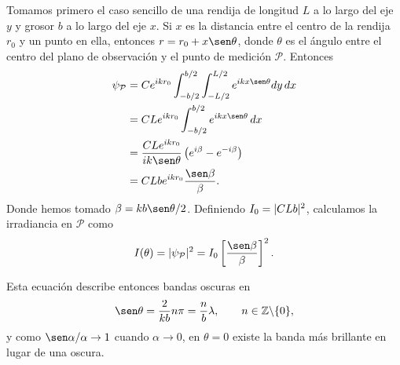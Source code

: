 \begin{multicols}{2}
Tomamos primero el caso sencillo de una rendija de longitud $L$ a lo largo del eje $y$ y grosor $b$ a lo largo del eje $x$. Si $x$ es la distancia entre el centro de la rendija $r_0$ y un punto en ella, entonces $r = r_0 + x \sen \theta$, donde $\theta$ es el ángulo entre el centro del plano de observación y el punto de medición $\mathcal P$. Entonces
\begin{equation}\label{eq: one}
	\begin{split}
		\psi_{\mathcal P} &= C\eto{ikr_0} \int_{-b/2}^{b/2} \int_{-L/2}^{L/2} \eto{ik x \sen \theta} dy \, dx\\
		&= C L\eto{ikr_0}  \int_{-b/2}^{b/2}  \eto{ik x \sen \theta}  \, dx\\
		&= \frac{C L\eto{ikr_0}}{ik \sen \theta} \left(\eto{i\beta} - \eto{-i\beta} \right )\\
		&=  CLb\eto{ikr_0} \frac{\sen\beta}{\beta}.
	\end{split}
\end{equation}
Donde hemos tomado $\beta = kb \sen \theta /2$.
Definiendo $I_0 = \lvert CLb\rvert^2$, calculamos la irradiancia en $\mathcal P$ como
\begin{equation}
	I(\theta) = \abs{\psi_\mathcal{P}}^2 = I_0 \left[ \frac{\sen \beta}{\beta}\right]^2.
\end{equation}

Esta ecuación describe entonces bandas oscuras en
\begin{equation}\label{eq: distance}
	\sen \theta = \frac{2}{kb} n\pi = \frac{n}{b}\lambda, \qquad n \in \mathbb Z \backslash\{0\},
\end{equation}
y como $\sen \alpha/\alpha \to 1$ cuando $\alpha \to 0$, en $\theta = 0$ existe la banda más brillante en lugar de una oscura.


\end{multicols}
